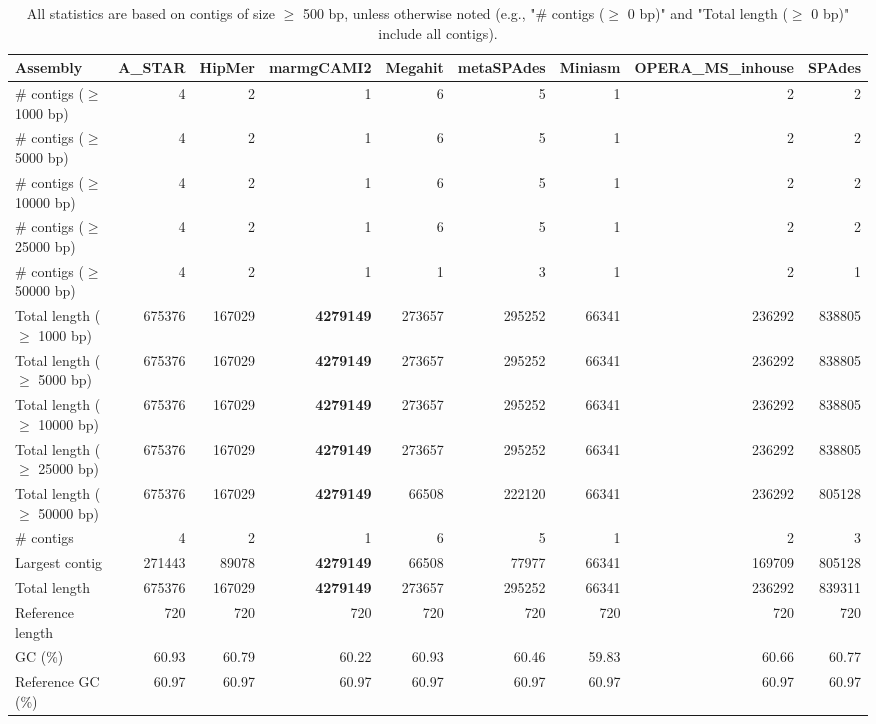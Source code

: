 \documentclass[12pt,a4paper]{article}
\begin{document}
\begin{table}[ht]
\begin{center}
\caption{All statistics are based on contigs of size $\geq$ 500 bp, unless otherwise noted (e.g., "\# contigs ($\geq$ 0 bp)" and "Total length ($\geq$ 0 bp)" include all contigs).}
\begin{tabular}{|l*{8}{|r}|}
\hline
Assembly & A\_STAR & HipMer & marmgCAMI2 & Megahit & metaSPAdes & Miniasm & OPERA\_MS\_inhouse & SPAdes \\ \hline
\# contigs ($\geq$ 1000 bp) & 4 & 2 & 1 & 6 & 5 & 1 & 2 & 2 \\ \hline
\# contigs ($\geq$ 5000 bp) & 4 & 2 & 1 & 6 & 5 & 1 & 2 & 2 \\ \hline
\# contigs ($\geq$ 10000 bp) & 4 & 2 & 1 & 6 & 5 & 1 & 2 & 2 \\ \hline
\# contigs ($\geq$ 25000 bp) & 4 & 2 & 1 & 6 & 5 & 1 & 2 & 2 \\ \hline
\# contigs ($\geq$ 50000 bp) & 4 & 2 & 1 & 1 & 3 & 1 & 2 & 1 \\ \hline
Total length ($\geq$ 1000 bp) & 675376 & 167029 & {\bf 4279149} & 273657 & 295252 & 66341 & 236292 & 838805 \\ \hline
Total length ($\geq$ 5000 bp) & 675376 & 167029 & {\bf 4279149} & 273657 & 295252 & 66341 & 236292 & 838805 \\ \hline
Total length ($\geq$ 10000 bp) & 675376 & 167029 & {\bf 4279149} & 273657 & 295252 & 66341 & 236292 & 838805 \\ \hline
Total length ($\geq$ 25000 bp) & 675376 & 167029 & {\bf 4279149} & 273657 & 295252 & 66341 & 236292 & 838805 \\ \hline
Total length ($\geq$ 50000 bp) & 675376 & 167029 & {\bf 4279149} & 66508 & 222120 & 66341 & 236292 & 805128 \\ \hline
\# contigs & 4 & 2 & 1 & 6 & 5 & 1 & 2 & 3 \\ \hline
Largest contig & 271443 & 89078 & {\bf 4279149} & 66508 & 77977 & 66341 & 169709 & 805128 \\ \hline
Total length & 675376 & 167029 & {\bf 4279149} & 273657 & 295252 & 66341 & 236292 & 839311 \\ \hline
Reference length & 720 & 720 & 720 & 720 & 720 & 720 & 720 & 720 \\ \hline
GC (\%) & 60.93 & 60.79 & 60.22 & 60.93 & 60.46 & 59.83 & 60.66 & 60.77 \\ \hline
Reference GC (\%) & 60.97 & 60.97 & 60.97 & 60.97 & 60.97 & 60.97 & 60.97 & 60.97 \\ \hline

\end{tabular}
\end{center}
\end{table}
\end{document}
